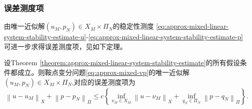 \subsubsection{误差测度项}
由唯一近似解$\left( u_{M}, p_{N} \right) \in X_{M} \times \Pi_{N}$的稳定性测度
\eqref{eq:approx-mixed-linear-system-stability-estimate-u}-\eqref{eq:approx-mixed-linear-system-stability-estimate-p}可进一步求得误差测度项，见如下定理。
\begin{theorem}[误差测度项]
  \label{theorem:approx-mixed-linear-system-error-estimate}
  设Theorem \ref{theorem:approx-mixed-linear-system-stability-estimate}的所有假设条件都成立。则鞍点变分问题\eqref{eq:approx-mixed-vp}的唯一近似解$\left( u_{M}, p_{N} \right) \in X_{M} \times \Pi_{N}$,对应的误差测度项为
  \begin{equation}
    \label{eq:approx-mixed-linear-system-error-estimate}
    \left\| u-u_{M} \right\|_{X} +
    \left\| p-p_{N} \right\|_{\Pi}
    \le c \left\{
    \inf_{\nu_{M} \in X_{M}}
    \left\| u - \nu_{M} \right\|_{X} +
    \inf_{q_{N} \in \Pi_{N}}
    \left\| p - q_{N} \right\|_{\Pi}
    \right\}.
  \end{equation}
\end{theorem}
